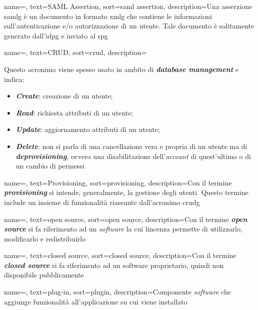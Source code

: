{
    name=,
    text=SAML Assertion,
    sort=saml assertion,
    description={Una asserzione \gls{samlg} è un documento in formato \gls{xmlg} che contiene le informazioni sull'autenticazione e/o autorizzazione di un utente. Tale documento è solitamente generato dall'\gls{idpg} e inviato al \gls{spg}}
}

{
    name=,
    text=CRUD,
    sort=crud,
    description={Questo acronimo viene spesso usato in ambito di \textit{\textbf{database management}} e indica:
    \begin{itemize}
        \item \textit{\textbf{Create}}: creazione di un utente;
        \item \textit{\textbf{Read}}: richiesta attributi di un utente;
        \item \textit{\textbf{Update}}: aggiornamento attributi di un utente;
        \item \textit{\textbf{Delete}}: non si parla di una cancellazione vera e propria di un utente ma di \textit{\textbf{deprovisioning}}, ovvero una disabilitazione dell'\textit{account} di quest'ultimo o di un cambio di permessi
    \end{itemize}}
}

{
    name=,
    text=Provisioning,
    sort=provisioning,
    description={Con il termine \textit{\textbf{provisioning}} si intende, generalmente, la gestione degli utenti. Questo termine include un insieme di funzionalità riassunte dall'acronimo \gls{crudg}}
}

{
    name=,
    text=open source,
    sort=open source,
    description={Con il termine \textit{\textbf{open source}} si fa riferimento ad un \textit{software} la cui lincenza permette di utilizzarlo, modificarlo e redistribuirlo}
}

{
    name=,
    text=closed source,
    sort=closed source,
    description={Con il termine \textit{\textbf{closed source}} si fa riferimento ad un software proprietario, quindi non disponibile pubblicamente}
}

{
    name=,
    text=plug-in,
    sort=plugin,
    description={Componente \textit{software} che aggiunge funzionalità all'applicazione su cui viene installato}
}

